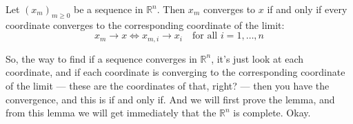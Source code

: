 \begin{nice-box}
\begin{lemma}\label{lem:coordinate-convergence}
Let $(x_m)_{m \ge 0}$ be a sequence in $\mathbb{R}^n$. Then $x_m$ converges to $x$ if and only if every coordinate converges to the corresponding coordinate of the limit:
\[ x_m \to x \iff x_{m,i} \to x_i \quad \text{for all } i = 1, \dots, n \]
\end{lemma}
\end{nice-box}

\begin{spoken-clean}[00:15:51 - 00:17:20]
So, the way to find if a sequence converges in $\mathbb{R}^n$, it's just look at each coordinate, and if each coordinate is converging to the corresponding coordinate of the limit --- these are the coordinates of that, right? --- then you have the convergence, and this is if and only if. And we will first prove the lemma, and from this lemma we will get immediately that the $\mathbb{R}^n$ is complete. Okay.
\end{spoken-clean}

